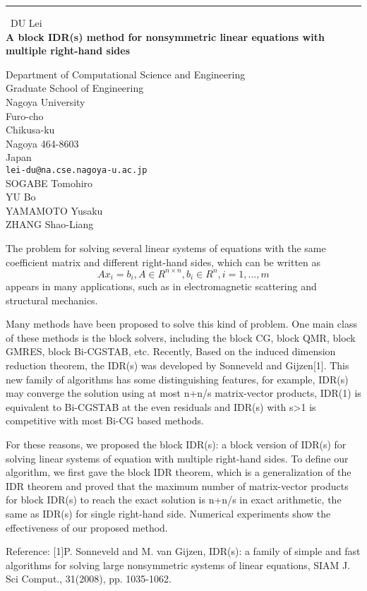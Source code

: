\documentclass{report}
\begin{document}
\begin{center}
\rule{6in}{1pt} \
{\large DU Lei \\
{\bf A block IDR(s) method for nonsymmetric linear equations with multiple right-hand sides}}

Department of Computational Science and Engineering \\ Graduate School of Engineering \\ Nagoya University \\ Furo-cho \\ Chikusa-ku \\ Nagoya 464-8603 \\ Japan
\\
{\tt lei-du@na.cse.nagoya-u.ac.jp}\\
SOGABE Tomohiro\\
YU Bo\\
YAMAMOTO Yusaku\\
ZHANG Shao-Liang\end{center}

The problem for solving several linear systems of equations with the same
coefficient matrix and different right-hand sides, which can be written
as
\begin{equation}
Ax_i=b_i, A\in R^{n\times n}, b_i\in R^n, i=1,...,m
\end{equation}
appears in many applications, such as in electromagnetic scattering and
structural mechanics.

Many methods have been proposed to solve this kind of problem. One main
class of these methods is the block solvers, including the block CG,
block QMR, block GMRES, block Bi-CGSTAB, etc.
Recently, Based on the induced dimension reduction theorem, the IDR(s)
was developed by Sonneveld and Gijzen[1]. This new family of algorithms
has some distinguishing features, for example, IDR(s) may converge the
solution using at most n+n/s matrix-vector products, IDR(1) is equivalent
to Bi-CGSTAB at the even residuals and IDR(s) with s>1 is competitive
with most Bi-CG based methods.

For these reasons, we proposed the block IDR(s): a block version of
IDR(s) for solving linear systems of equation with multiple right-hand
sides. To define our algorithm, we first gave the block IDR theorem,
which is a generalization of the IDR theorem and proved that the maximum
number of matrix-vector products for block IDR(s) to reach the exact
solution is n+n/s in exact arithmetic, the same as IDR(s) for single
right-hand side. Numerical experiments show the effectiveness of our
proposed method.

Reference:
[1]P. Sonneveld and M. van Gijzen, IDR(s): a family of simple and fast
algorithms for solving large nonsymmetric systems of linear equations,
SIAM J. Sci Comput., 31(2008), pp. 1035-1062.
\end{document}
